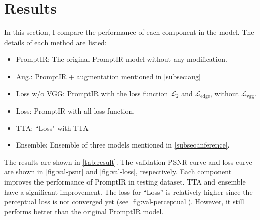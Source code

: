 \documentclass[10pt,twocolumn,letterpaper]{article}
\begin{document}
\section{Results}

In this section, I compare the performance of each component in the model.
The details of each method are listed:
\begin{itemize}
  \setlength\itemsep{0pt}
  \item PromptIR: The original PromptIR model without any modification.
  \item Aug.: PromptIR + augmentation mentioned in \cref{subsec:aug}
  \item Loss w/o VGG: PromptIR with the loss function
    $\mathcal{L}_{2}$ and $\mathcal{L}_{\text{edge}}$, without
    $\mathcal{L}_{\text{vgg}}$.
  \item Loss: PromptIR with all loss function.
  \item TTA: ``Loss" with TTA
  \item Ensemble: Ensemble of three models mentioned in \cref{subsec:inference}.
\end{itemize}

The results are shown in \cref{tab:result}. The validation PSNR curve and loss
curve are shown in \cref{fig:val-psnr} and \cref{fig:val-loss}, respectively.
Each component improves the performance of PromptIR in testing dataset. TTA and
ensemble have a significant improvement. The loss for ``Loss'' is relatively
higher since the perceptual loss is not converged yet (see \cref{fig:val-perceptual}).
However, it still performs better than the original PromptIR model.
\end{document}
